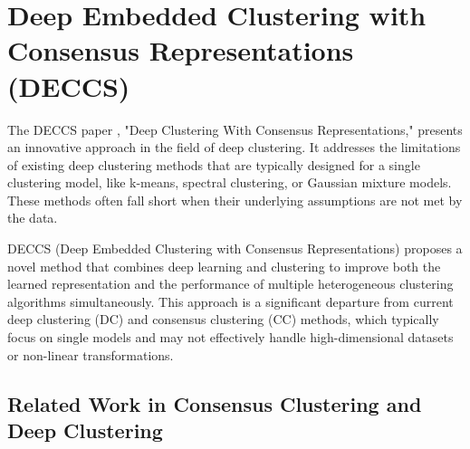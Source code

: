 \section{Deep Embedded Clustering with Consensus Representations (DECCS)}

The DECCS paper \citep{Miklautz2021}, "Deep Clustering With Consensus Representations," presents an innovative approach in the field of deep clustering. It addresses the limitations of existing deep clustering methods that are typically designed for a single clustering model, like k-means, spectral clustering, or Gaussian mixture models. These methods often fall short when their underlying assumptions are not met by the data.

DECCS (Deep Embedded Clustering with Consensus Representations) proposes a novel method that combines deep learning and clustering to improve both the learned representation and the performance of multiple heterogeneous clustering algorithms simultaneously. This approach is a significant departure from current deep clustering (DC) and consensus clustering (CC) methods, which typically focus on single models and may not effectively handle high-dimensional datasets or non-linear transformations.

\subsection{Related Work in Consensus Clustering and Deep Clustering}


